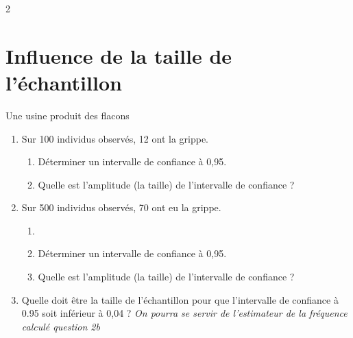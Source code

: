 \documentclass[10pt,a4paper]{article}
\begin{document}
\begin{multicols}{2}
\section{Influence de la taille de l'échantillon}

\begin{exo}[][]
    Une usine produit des flacons
    \begin{enumerate}
        \item Sur 100 individus observés, 12 ont la grippe. \begin{enumerate}
            \item Déterminer un intervalle de confiance à 0,95.
            \item Quelle est l'amplitude (la taille) de l'intervalle de confiance ?
        \end{enumerate}
        \item Sur 500 individus observés, 70 ont eu la grippe. \begin{enumerate}
            \item \item Déterminer un intervalle de confiance à 0,95.
            \item Quelle est l'amplitude (la taille) de l'intervalle de confiance ? 
        \end{enumerate}
        \item Quelle doit être la taille de l'échantillon pour que l'intervalle de confiance à 0.95 soit inférieur à 0,04 ? \textit{On pourra se servir de l'estimateur de la fréquence calculé question 2b}
    \end{enumerate}
\end{exo}
\end{multicols}
\end{document}
